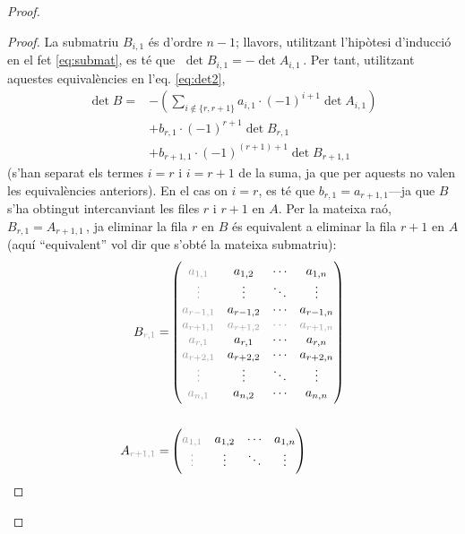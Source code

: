\begin{teo}
\begin{proof}
\begin{lema}
\begin{adjustwidth}{0.8cm}{}
\begin{proof}
			La submatriu $B_{i,1}$ és d'ordre $n-1$; llavors, utilitzant l'hipòtesi d'inducció en el fet \eqref{eq:submat}, es té que $\;\det B_{i,1} = - \det A_{i,1}\,$. Per tant, utilitzant aquestes equivalències en l'eq. \eqref{eq:det2},
			\begin{equation}\label{eq:dev1}
			\begin{split}
			\det B =& 	-\left(\sum_{i\notin \{r, r+1\}} a_{i,1}\cdot(-1)^{i+1}\det A_{i,1}\right)\\
					&	+ b_{r,1}\cdot(-1)^{r+1}\det B_{r,1}\\
					&	+ b_{r+1,1}\cdot(-1)^{(r+1)+1}\det B_{r+1,1}\,
			\end{split}
			\end{equation}
			(s'han separat els termes $i=r$ i $i=r+1$ de la suma, ja que per aquests no valen les equivalències anteriors).
			En el cas on $i = r$, es té que $b_{r,1} = a_{r+1,1}$---ja que $B$ s'ha obtingut intercanviant les files $r$ i $r+1$ en $A$. Per la mateixa raó, $B_{r,1} = A_{r+1, 1}\,$, ja eliminar la fila $r$ en $B$ és equivalent a eliminar la fila $r+1$ en $A$ (aquí ``equivalent'' vol dir que s'obté la mateixa submatriu):
%
			\begin{alignat*}{2}
			B_{\color[gray]{0.6}r,1} = &
			\begin{pmatrix}
			\color[gray]{0.6}
			a_{1,1} &	a_{1,2} &	\cdots &	a_{1,n} \\
			\color[gray]{0.6}
			\vdots &	\vdots &	\ddots &	\vdots \\
			\color[gray]{0.6}
			a_{r-1,1} &	a_{r-1,2} &	\cdots &	a_{r-1,n} \\
			\color[gray]{0.6}
			a_{r+1,1} &	\color[gray]{0.6}a_{r+1,2} &\color[gray]{0.6}	\cdots &	\color[gray]{0.6}a_{r+1,n}  \\
			\color[gray]{0.6}
			a_{r,1} &	a_{r,1} &	\cdots &	a_{r,n} \\
			\color[gray]{0.6}
			a_{r+2,1} &	a_{r+2,2} &	\cdots &	a_{r+2,n} \\
			\color[gray]{0.6}
			\vdots &	\vdots &	\ddots &	\vdots \\
			\color[gray]{0.6}
			a_{n,1} &	a_{n,2} &	\cdots &	a_{n,n} \\
			\end{pmatrix}
%
			\\ \\
%
			A_{\color[gray]{0.6}r+1,1} = &
			\begin{pmatrix}
			\color[gray]{0.6}
			a_{1,1} &	a_{1,2} &	\cdots &	a_{1,n} \\
			\color[gray]{0.6}
			\vdots &	\vdots &	\ddots &	\vdots \\

\end{pmatrix}
\end{alignat*}
\end{proof}
\end{adjustwidth}
\end{lema}
\end{proof}
\end{teo}
